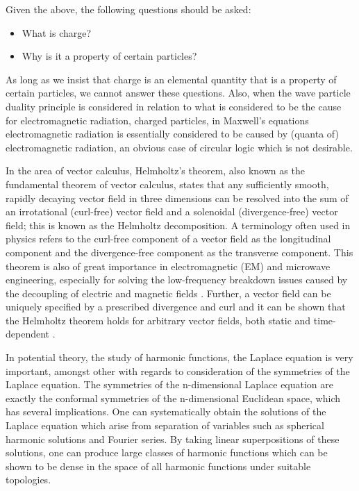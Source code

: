 \documentclass[twoside,final]{article}
\begin{document}
{Given the above, the following questions should be asked: 

\begin{itemize}
\item What is charge?
\item Why is it a property of certain particles?
\end{itemize}

As long as we insist that charge is an elemental quantity that is a property of
certain particles, we cannot answer these questions. Also, when the wave
particle duality principle is considered in relation to what is considered to be
the cause for electromagnetic radiation, charged particles, in Maxwell's
equations electromagnetic radiation is essentially considered to be caused by
(quanta of) electromagnetic radiation, an obvious case of circular logic which
is not desirable. 

In the area of vector calculus, Helmholtz's theorem, also known as the
fundamental theorem of vector calculus, states that any sufficiently smooth,
rapidly decaying vector field in three dimensions can be resolved into the sum
of an irrotational (curl-free) vector field and a solenoidal (divergence-free)
vector field; this is known as the Helmholtz decomposition. A terminology often
used in physics refers to the curl-free component of a vector field as the
longitudinal component and the divergence-free component as the transverse
component. This theorem is also of great importance in electromagnetic (EM) and
microwave engineering, especially for solving the low-frequency breakdown issues
caused by the decoupling of electric and magnetic fields \cite{Xiong2014}.
Further, a vector field can be uniquely specified by a prescribed divergence and
curl and it can be shown that the Helmholtz theorem holds for arbitrary vector
fields, both static and time-dependent \cite{Oleinik2003}.

In potential theory, the study of harmonic functions, the Laplace equation is
very important, amongst other with regards to consideration of the symmetries of
the Laplace equation. The symmetries of the n-dimensional Laplace equation are
exactly the conformal symmetries of the n-dimensional Euclidean space, which has
several implications. One can systematically obtain the solutions of the Laplace
equation which arise from separation of variables such as spherical harmonic
solutions and Fourier series. By taking linear superpositions of these
solutions, one can produce large classes of harmonic functions which can be
shown to be dense in the space of all harmonic functions under suitable
topologies. 

}
\end{document}
